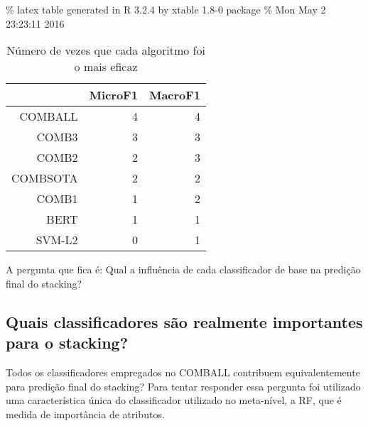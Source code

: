 \documentclass[]{article}
\begin{document}
\% latex table generated in R 3.2.4 by xtable 1.8-0 package \% Mon May 2
23:23:11 2016

\begin{table}[ht]
\centering
\begin{tabular}{rrr}
  \hline
 & MicroF1 & MacroF1 \\ 
  \hline
COMBALL &   4 &   4 \\ 
  COMB3 &   3 &   3 \\ 
  COMB2 &   2 &   3 \\ 
  COMBSOTA &   2 &   2 \\ 
  COMB1 &   1 &   2 \\ 
  BERT &   1 &   1 \\ 
  SVM-L2 &   0 &   1 \\ 
   \hline
\end{tabular}
\caption{Número de vezes que cada algoritmo foi o mais eficaz} 
\label{tab:win_count_stacking}
\end{table}

A pergunta que fica é: Qual a influência de cada classificador de base
na predição final do stacking?

\subsection{Quais classificadores são realmente importantes para o
stacking?}\label{quais-classificadores-sao-realmente-importantes-para-o-stacking}

Todos os classificadores empregados no COMBALL contribuem
equivalentemente para predição final do stacking? Para tentar responder
essa pergunta foi utilizado uma característica única do classificador
utilizado no meta-nível, a RF, que é medida de importância de atributos.
\end{document}
